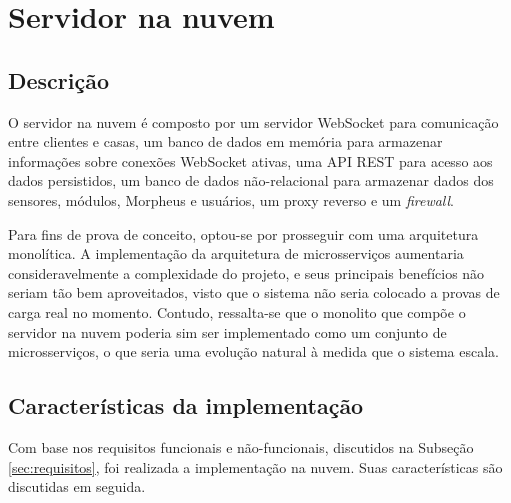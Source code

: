 \section{Servidor na nuvem \label{servidorNaNuvem}}

\subsection{Descrição}

O servidor na nuvem é composto por um servidor WebSocket para comunicação entre clientes e casas, um banco de dados em memória para armazenar informações sobre conexões WebSocket ativas, uma API REST para acesso aos dados persistidos, um banco de dados não-relacional para armazenar dados dos sensores, módulos, Morpheus e usuários, um proxy reverso e um \emph{firewall}.

Para fins de prova de conceito, optou-se por prosseguir com uma arquitetura monolítica. A implementação da arquitetura de microsserviços aumentaria consideravelmente a complexidade do projeto, e seus principais benefícios não seriam tão bem aproveitados, visto que o sistema não seria colocado a provas de carga real no momento. Contudo, ressalta-se que o monolito que compõe o servidor na nuvem poderia sim ser implementado como um conjunto de microsserviços, o que seria uma evolução natural à medida que o sistema escala.

\subsection{Características da implementação}

Com base nos requisitos funcionais e não-funcionais, discutidos na Subseção \ref{sec:requisitos}, foi realizada a implementação na nuvem. Suas características são discutidas em seguida.

